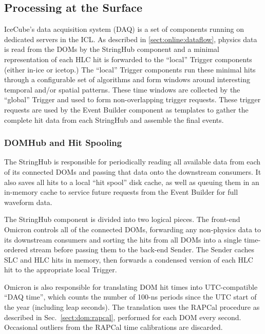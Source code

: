 \subsection{Processing at the Surface}

IceCube's data acquisition system (DAQ) is a set of components running on
dedicated servers in the ICL.  As described in \ref{sect:online:dataflow}, physics data is read from the DOMs by the StringHub
component and a minimal representation of each HLC hit is forwarded to the
``local'' Trigger components (either in-ice or icetop.)
The ``local'' Trigger components run these
minimal hits through a configurable set of algorithms and form windows around
interesting temporal and/or spatial patterns.  These time windows are collected
by the ``global'' Trigger and used to form non-overlapping trigger requests.
These trigger requests are used by the Event Builder component as templates to
gather the complete hit data from each StringHub and assemble the final events.

\subsubsection{DOMHub and Hit Spooling}
\label{sec:domhub_hitspool}

The StringHub is responsible for periodically reading all available data
from each of its connected DOMs and passing that data onto the downstream
consumers.  It also saves all hits to a local ``hit spool'' disk cache, as
well as queuing them in an in-memory cache to service future requests from
the Event Builder for full waveform data.

The StringHub component is divided into two logical pieces.  The front-end
Omicron controls all of the connected DOMs, forwarding any
non-physics data to its downstream consumers and sorting the hits from all
DOMs into a single time-ordered stream
before passing them to the back-end Sender.  The Sender
caches SLC and HLC hits in memory, then forwards a condensed version of
each HLC hit to the appropriate local Trigger.

Omicron is also responsible for translating DOM hit times into
UTC-compatible ``DAQ time'', which counts the number of 100-ns periods
since the UTC start of the year (including leap seconds).  The translation
uses the RAPCal procedure as described in Sec.~\ref{sect:dom:rapcal},
performed for each DOM every second. Occasional outliers from the RAPCal time
calibrations are discarded.

